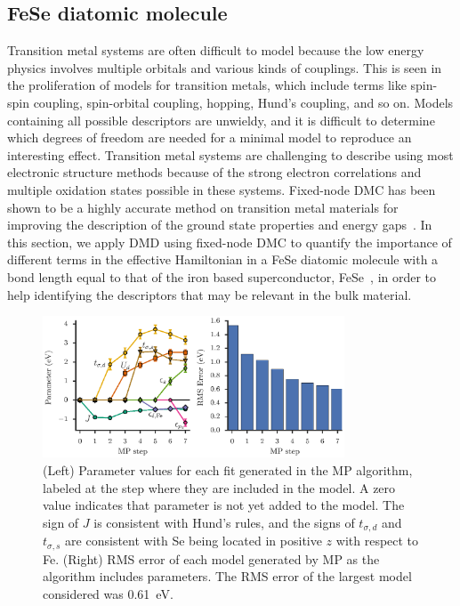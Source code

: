 \subsection{FeSe diatomic molecule}
\label{subsection:fese}
Transition metal systems are often difficult to model because the low energy physics involves multiple orbitals and various kinds of 
couplings. This is seen in the proliferation of models for transition metals, which include terms like spin-spin coupling, spin-orbital coupling, hopping, Hund's coupling, and so on. 
Models containing all possible descriptors are unwieldy, and it is difficult to determine which degrees of freedom are needed for a minimal model to reproduce an interesting effect. 
Transition metal systems are challenging to describe using most electronic structure methods because of the strong electron correlations and multiple oxidation states possible in these systems. 
Fixed-node DMC has been shown to be a highly accurate method on transition metal materials for improving the description of the ground state properties and energy gaps~\cite{Foyevtsova2014, Wagner_Abbamonte, Zheng2015, Wagner2016}. In this section, we apply DMD using fixed-node DMC to quantify the importance of different terms in the effective Hamiltonian in a FeSe diatomic molecule with a bond length equal to that of the iron based superconductor, FeSe~\cite{kumar_crystal_2010}, in order to help identifying the descriptors that may be relevant in the bulk material.
\begin{figure}[htb]
  \centering
  \includegraphics[width=0.8\textwidth]{./Figures/fese.eps}
  \caption{
    \label{fig:fese} 
    (Left) Parameter values for each fit generated in the MP algorithm, labeled at the step where they are included in the model. 
    A zero value indicates that parameter is not yet added to the model.
    The sign of $J$ is consistent with Hund's rules, and the signs of $t_{\sigma,d}$ and $t_{\sigma,s}$ are consistent with Se being located in positive $z$ with respect to Fe. 
    (Right) RMS error of each model generated by MP as the algorithm includes parameters. 
    The RMS error of the largest model considered was 0.61~eV.
  }
\end{figure}
